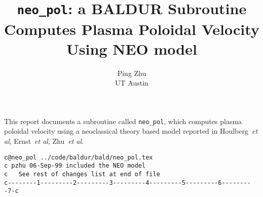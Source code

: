 \headheight 0pt \headsep 0pt  \topmargin 0pt  \oddsidemargin 0pt
\textheight 9.0in \textwidth 6.5in

\title{ {\tt neo\_pol}: a BALDUR Subroutine \\
 Computes Plasma Poloidal Velocity \\
 Using NEO model}     %
\author{
        Ping Zhu \\ UT Austin}
\maketitle                 %

This report documents a subroutine called {\tt neo\_pol}, which computes plasma
poloidal velocity using a neoclassical theory based model reported in Houlberg~{\it et al}\cite{houlberg97}, Ernst~{\it et al}\cite{ernst98}, Zhu~{\it et al}\cite{zhu99}. 

\begin{verbatim}
c@neo_pol ../code/baldur/bald/neo_pol.tex
c pzhu 06-Sep-99 included the NEO model
c   See rest of changes list at end of file
c--------1---------2---------3---------4---------5---------6---------7-c
\end{verbatim}

